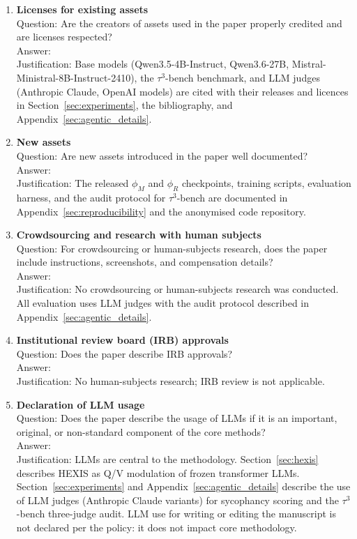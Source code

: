 \begin{enumerate}
\item {\bf Licenses for existing assets}\\
    Question: Are the creators of assets used in the paper properly credited
    and are licenses respected?\\
    Answer: \answerYes{}\\
    Justification: Base models (Qwen3.5-4B-Instruct, Qwen3.6-27B,
    Mistral-Ministral-8B-Instruct-2410), the $\tau^3$-bench benchmark, and
    LLM judges (Anthropic Claude, OpenAI models) are cited with their
    releases and licences in Section~\ref{sec:experiments}, the bibliography,
    and Appendix~\ref{sec:agentic_details}.

\item {\bf New assets}\\
    Question: Are new assets introduced in the paper well documented?\\
    Answer: \answerYes{}\\
    Justification: The released $\phi_M$ and $\phi_R$ checkpoints, training
    scripts, evaluation harness, and the audit protocol for $\tau^3$-bench
    are documented in Appendix~\ref{sec:reproducibility} and the anonymised
    code repository.

\item {\bf Crowdsourcing and research with human subjects}\\
    Question: For crowdsourcing or human-subjects research, does the paper
    include instructions, screenshots, and compensation details?\\
    Answer: \answerNA{}\\
    Justification: No crowdsourcing or human-subjects research was conducted.
    All evaluation uses LLM judges with the audit protocol described in
    Appendix~\ref{sec:agentic_details}.

\item {\bf Institutional review board (IRB) approvals}\\
    Question: Does the paper describe IRB approvals?\\
    Answer: \answerNA{}\\
    Justification: No human-subjects research; IRB review is not applicable.

\item {\bf Declaration of LLM usage}\\
    Question: Does the paper describe the usage of LLMs if it is an important,
    original, or non-standard component of the core methods?\\
    Answer: \answerYes{}\\
    Justification: LLMs are central to the methodology.
    Section~\ref{sec:hexis} describes HEXIS as Q/V modulation of frozen
    transformer LLMs. Section~\ref{sec:experiments} and
    Appendix~\ref{sec:agentic_details} describe the use of LLM judges
    (Anthropic Claude variants) for sycophancy scoring and the $\tau^3$-bench
    three-judge audit. LLM use for writing or editing the manuscript is not
    declared per the policy: it does not impact core methodology.

\end{enumerate}
